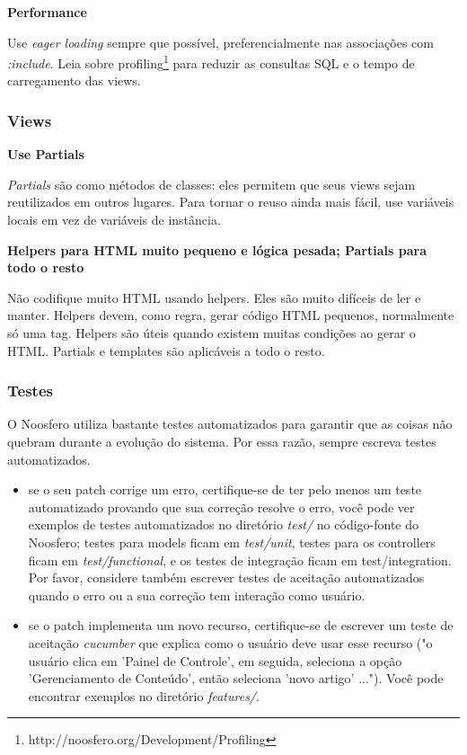 \documentclass[11pt]{article}
\begin{document}
{\bf Performance}

Use {\it eager loading} sempre que possível, preferencialmente nas associações
com {\it :include}. Leia sobre
profiling\footnote{http://noosfero.org/Development/Profiling} para reduzir as
consultas SQL e o tempo de carregamento das views.

\subsubsection{Views}

{\bf Use Partials}

{\it Partials} são como métodos de classes: eles permitem que seus views sejam
reutilizados em outros lugares. Para tornar o reuso ainda mais fácil, use
variáveis locais em vez de variáveis de instância.

{\bf Helpers para HTML muito pequeno e lógica pesada; Partials para todo o
resto}

Não codifique muito HTML usando helpers. Eles são muito difíceis de ler e
manter. Helpers devem, como regra, gerar código HTML pequenos, normalmente só
uma tag. Helpers são úteis quando existem muitas condições ao gerar o HTML.
Partials e templates são aplicáveis a todo o resto.

\subsubsection{Testes}

O Noosfero utiliza bastante testes automatizados para garantir que as coisas
não quebram durante a evolução do sistema. Por essa razão,
sempre escreva testes automatizados.

\begin{itemize}
  \item se o seu patch corrige um erro, certifique-se de ter pelo menos um
    teste automatizado provando que sua correção resolve o erro, você pode ver
    exemplos de testes automatizados no diretório {\it test/} no código-fonte do
    Noosfero; testes para models ficam em {\it test/unit}, testes para os
    controllers ficam em {\it test/functional}, e os testes de integração ficam em
    test/integration. Por favor, considere também escrever testes de aceitação
    automatizados quando o erro ou a sua correção tem interação
    como usuário.
  \item se o patch implementa um novo recurso, certifique-se de escrever um
    teste de aceitação {\it cucumber} que explica como o usuário deve usar esse
    recurso ("o usuário clica em 'Painel de Controle', em seguida, seleciona a
    opção 'Gerenciamento de Conteúdo', então seleciona 'novo artigo' ...").
    Você pode encontrar exemplos no diretório {\it features/}.
\end{itemize}
\end{document}
